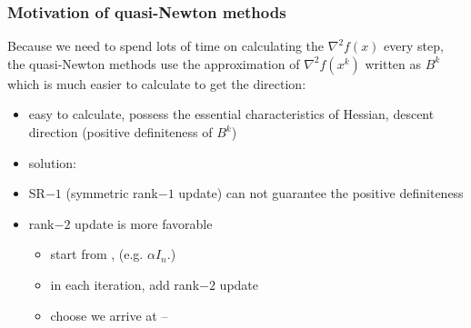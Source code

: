 	\subsubsection{Motivation of quasi-Newton methods}
	Because we need to spend lots of time on calculating the $\nabla^2 f(x)$ every step, the quasi-Newton methods use the approximation of $\nabla^2 f(x^k)$ written as $B^k$ which is much easier to calculate to get the direction:
	\vspace{-7mm}
	\begin{itemize}
		\item easy to calculate, possess the essential characteristics of Hessian, descent direction (positive definiteness of $B^k$)
		\item solution: 
		\vspace{-7mm}
		\item SR$-1$ (symmetric rank$-1$ update) can not guarantee the positive definiteness
		\item rank$-2$ update is more favorable
		\begin{itemize}
			\item start from , (e.g. $\alpha I_n$.)\\[1mm]
			\item in each iteration, add rank$-2$ update
			\\[1mm]
			\item choose  we arrive at -- 
		\end{itemize}
	\end{itemize}

